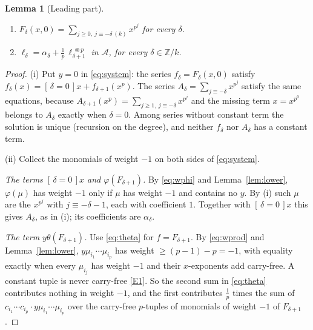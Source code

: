 \documentclass[11pt]{article}
\newtheorem{lemma}[theorem]{Lemma}
\theoremstyle{definition}
\theoremstyle{remark}
\newcommand{\Z}{\mathbb Z}
\newcommand{\A}{\mathcal A}
\newcommand{\cf}{\circledast}
\newcommand{\br}[1]{[\,#1\,]}
\begin{document}
\begin{lemma}[Leading part]\label{lem:lead}
\begin{enumerate}[label=(\roman*)]
\item $F_\delta(x,0)=\sum_{j\ge0,\ j\equiv-\delta\ (k)}x^{p^j}$ for every $\delta$.
\item $\displaystyle \ell_\delta=\alpha_\delta+\frac1p\,\ell_{\delta+1}^{\;\cf p}$ in $\A$,
      for every $\delta\in\Z/k$.
\end{enumerate}
\end{lemma}

\begin{proof}
(i) Put $y=0$ in \eqref{eq:system}: the series $f_\delta=F_\delta(x,0)$ satisfy
$f_\delta(x)=\br{\delta=0}x+f_{\delta+1}(x^p)$. The series
$A_\delta=\sum_{j\equiv-\delta}x^{p^j}$ satisfy the same equations, because
$A_{\delta+1}(x^p)=\sum_{j\ge1,\ j\equiv-\delta}x^{p^{j}}$ and the missing term $x=x^{p^0}$
belongs to $A_\delta$ exactly when $\delta=0$. Among series without constant term the solution
is unique (recursion on the degree), and neither $f_\delta$ nor $A_\delta$ has a constant term.

(ii) Collect the monomials of weight $-1$ on both sides of \eqref{eq:system}.

\emph{The terms $\br{\delta=0}x$ and $\varphi(F_{\delta+1})$.} By \eqref{eq:wphi} and
Lemma~\ref{lem:lower}, $\varphi(\mu)$ has weight $-1$ only if $\mu$ has weight $-1$ and
contains no $y$. By (i) such $\mu$ are the $x^{p^j}$ with $j\equiv-\delta-1$, each with
coefficient $1$. Together with $\br{\delta=0}x$ this gives $A_\delta$, as in (i); its
coefficients are $\alpha_\delta$.

\emph{The term $y\theta(F_{\delta+1})$.} Use \eqref{eq:theta} for $f=F_{\delta+1}$. By
\eqref{eq:wprod} and Lemma~\ref{lem:lower}, $y\mu_{i_1}\cdots\mu_{i_p}$ has weight
$\ge(p-1)-p=-1$, with equality exactly when every $\mu_{i_j}$ has weight $-1$ and their
$x$-exponents add carry-free. A constant tuple is never carry-free \ref{E1}. So the second sum
in \eqref{eq:theta} contributes nothing in weight $-1$, and the first contributes
$\frac1p$ times the sum of $c_{i_1}\cdots c_{i_p}\cdot y\mu_{i_1}\cdots\mu_{i_p}$ over the
carry-free $p$-tuples of monomials of weight $-1$ of $F_{\delta+1}$.


\end{proof}
\end{document}
